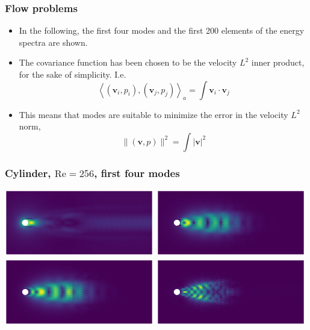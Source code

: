 \documentclass{beamer}
\begin{document}
\begin{frame}[fragile]
  \frametitle{Flow problems}

  \begin{itemize}
  \item In the following, the first four modes and the first 200 elements of the
    energy spectra are shown.
  \item The covariance function has been chosen to be the velocity $L^2$ inner
    product, for the sake of simplicity. I.e.
    \[ \left< (\bm v_i, p_i), (\bm v_j, p_j) \right>_a
      = \int \bm v_i \cdot \bm v_j \]
  \item This means that modes are suitable to minimize the error in the velocity
    $L^2$ norm,
    \[ \| (\bm v, p) \|^2 = \int |\bm v|^2 \]
  \end{itemize}
\end{frame}

\begin{frame}[fragile]
  \frametitle{Cylinder, $\text{Re}=256$, first four modes}

  \begin{center}
    \includegraphics[width=0.49\textwidth]{figs/cyl_256_0}
    \includegraphics[width=0.49\textwidth]{figs/cyl_256_1} \\
    \includegraphics[width=0.49\textwidth]{figs/cyl_256_2}
    \includegraphics[width=0.49\textwidth]{figs/cyl_256_3}
  \end{center}
\end{frame}
\end{document}
